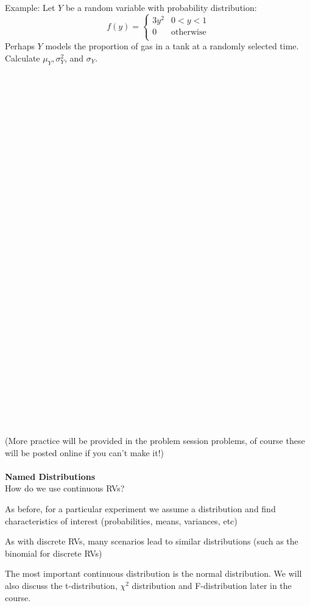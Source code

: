 \pagebreak

Example:  Let $Y$ be a random variable with probability distribution:
$$f(y) = \left\{\begin{array}{lc}
           3y^2 & 0<y<1 \\
           0 & \mbox{otherwise}\\
         \end{array}\right.$$
Perhaps $Y$ models the proportion of gas in a tank at a randomly selected time.  Calculate $\mu_Y, \sigma^2_Y$, and $\sigma_Y$.\\~\\~\\~\\~\\~\\~\\~\\~\\~\\~\\~\\~\\~\\~\\~\\~\\~\\~\\~\\~\\~\\~\\~\\~\\~\\~\\~\\~\\~\\~\\~\\
(More practice will be provided in the problem session problems, of course these will be posted online if you can't make it!)\\~\\
\textbf{Named Distributions}\\
How do we use continuous RVs?
\bi
\item As before, for a particular experiment we assume a distribution and find characteristics of interest (probabilities, means, variances, etc)
\item As with discrete RVs, many scenarios lead to similar distributions (such as the binomial for discrete RVs)
\item The most important continuous distribution is the normal distribution.  We will also discuss the t-distribution, $\chi^2$ distribution and F-distribution later in the course.
\ei

